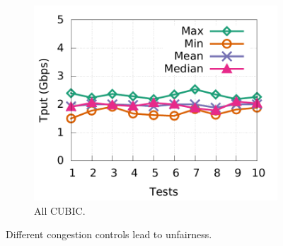 \begin{figure}[!t]
\begin{subfigure}[b]{0.45\textwidth}
                \includegraphics[width=\textwidth]{acdctcp/figures/tput_fairness/default_all_cubic_tput.pdf}
                \caption{All CUBIC.}
                \label{unfairness_all_cubic}
        \end{subfigure}
        \caption{Different congestion controls lead to unfairness.}
        \label{tput_unfair}
\end{figure}

